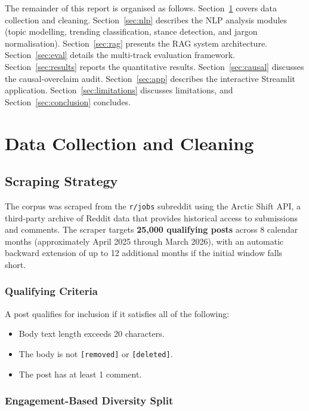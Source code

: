 \documentclass[11pt,a4paper]{article}
\begin{document}
The remainder of this report is organised as follows. Section~\ref{sec:data} covers data collection and cleaning. Section~\ref{sec:nlp} describes the NLP analysis modules (topic modelling, trending classification, stance detection, and jargon normalisation). Section~\ref{sec:rag} presents the RAG system architecture. Section~\ref{sec:eval} details the multi-track evaluation framework. Section~\ref{sec:results} reports the quantitative results. Section~\ref{sec:causal} discusses the causal-overclaim audit. Section~\ref{sec:app} describes the interactive Streamlit application. Section~\ref{sec:limitations} discusses limitations, and Section~\ref{sec:conclusion} concludes.


\section{Data Collection and Cleaning}
\label{sec:data}

\subsection{Scraping Strategy}
\label{sec:scraping}

The corpus was scraped from the \texttt{r/jobs} subreddit using the Arctic Shift API, a third-party archive of Reddit data that provides historical access to submissions and comments. The scraper targets \textbf{25,000 qualifying posts} across 8 calendar months (approximately April 2025 through March 2026), with an automatic backward extension of up to 12 additional months if the initial window falls short.

\subsubsection{Qualifying Criteria}

A post qualifies for inclusion if it satisfies all of the following:
\begin{itemize}[leftmargin=*]
  \item Body text length exceeds 20 characters.
  \item The body is not \texttt{[removed]} or \texttt{[deleted]}.
  \item The post has at least 1 comment.
\end{itemize}

\subsubsection{Engagement-Based Diversity Split}
\end{document}

